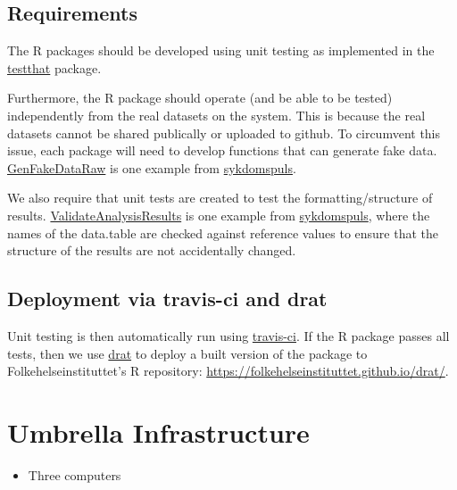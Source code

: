 \documentclass[12pt,]{article}
\providecommand{\tightlist}{%
  \setlength{\itemsep}{0pt}\setlength{\parskip}{0pt}}
\begin{document}
\subsection{Requirements}\label{requirements}

The R packages should be developed using unit testing as implemented in
the \href{http://r-pkgs.had.co.nz/tests.html}{testthat} package.

Furthermore, the R package should operate (and be able to be tested)
independently from the real datasets on the system. This is because the
real datasets cannot be shared publically or uploaded to github. To
circumvent this issue, each package will need to develop functions that
can generate fake data.
\href{https://folkehelseinstituttet.github.io/dashboards_sykdomspuls/reference/GenFakeDataRaw.html}{GenFakeDataRaw}
is one example from
\href{https://folkehelseinstituttet.github.io/dashboards_sykdomspuls/}{sykdomspuls}.

We also require that unit tests are created to test the
formatting/structure of results.
\href{https://folkehelseinstituttet.github.io/dashboards_sykdomspuls/reference/ValidateAnalysisResults.html}{ValidateAnalysisResults}
is one example from
\href{https://folkehelseinstituttet.github.io/dashboards_sykdomspuls/}{sykdomspuls},
where the names of the data.table are checked against reference values
to ensure that the structure of the results are not accidentally
changed.

\subsection{Deployment via travis-ci and
drat}\label{deployment-via-travis-ci-and-drat}

Unit testing is then automatically run using
\href{http://r-pkgs.had.co.nz/check.html\#travis}{travis-ci}. If the R
package passes all tests, then we use
\href{https://github.com/eddelbuettel/drat}{drat} to deploy a built
version of the package to Folkehelseinstituttet's R repository:
\url{https://folkehelseinstituttet.github.io/drat/}.

\section{Umbrella Infrastructure}\label{umbrella-infrastructure}

\begin{itemize}
\tightlist
\item
  Three computers
\end{itemize}
\end{document}
